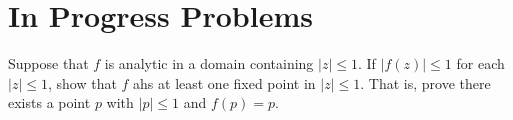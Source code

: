 \setchapterpreamble[u]{\margintoc}
\chapter{In Progress Problems}

\begin{qualproblem}[Spring 2020.C5]
    Suppose that $f$ is analytic in a domain containing $|z|\leq 1$. If $|f(z)|\leq 1$ for each $|z|\leq 1$, show that $f$ ahs at least one fixed point in $|z|\leq 1$. That is, prove there exists a point $p$ with $|p|\leq1$ and $f(p) = p$.


\end{qualproblem}

